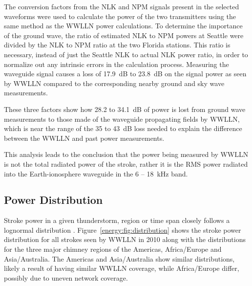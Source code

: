 The conversion factors from the NLK and NPM signals present in the selected waveforms were used to calculate the power of the two transmitters using the same method as the WWLLN power calculations.
To determine the importance of the ground wave, the ratio of estimated NLK to NPM powers at Seattle were divided by the NLK to NPM ratio at the two Florida stations.
This ratio is necessary, instead of just the Seattle NLK to actual NLK power ratio, in order to normalize out any intrinsic errors in the calculation process.
Measuring the waveguide signal causes a loss of 17.9~dB to 23.8~dB on the signal power as seen by WWLLN compared to the corresponding nearby ground and sky wave measurements.

These three factors show how 28.2 to 34.1~dB of power is lost from ground wave measurements to those made of the waveguide propagating fields by WWLLN, which is near the range of the 35 to 43~dB loss needed to explain the difference between the WWLLN and past power measurements.

This analysis leads to the conclusion that the power being measured by WWLLN is not the total radiated power of the stroke, rather it is the RMS power radiated into the Earth-ionosphere waveguide in the 6 -- 18~kHz band.

\subsection{Power Distribution}

Stroke power in a given thunderstorm, region or time span closely follows a lognormal distribution \citep{Golde1977}. Figure~\ref{energy:fig:distribution} shows the stroke power distribution for all strokes seen by WWLLN in 2010 along with the distributions for the three major chimney regions of the Americas, Africa/Europe and Asia/Australia.
The Americas and Asia/Australia show similar distributions, likely a result of having similar WWLLN coverage, while Africa/Europe differ, possibly due to uneven network coverage.




